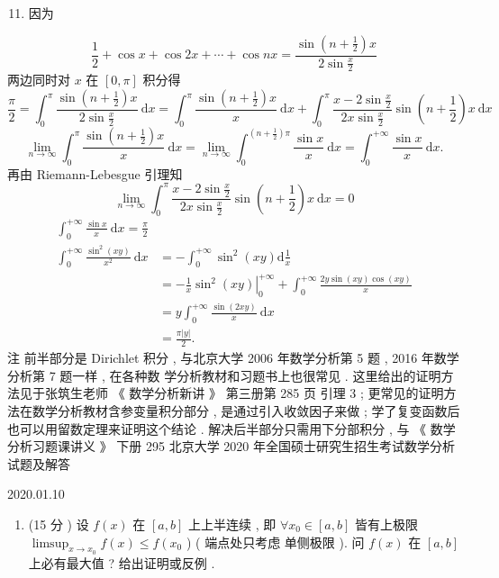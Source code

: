 \documentclass[10pt]{article}
\begin{document}
{\begin{enumerate}
  \setcounter{enumi}{10}
  \item  因为 
\end{enumerate}
$$
\frac{1}{2}+\cos x+\cos 2 x+\cdots+\cos n x=\frac{\sin \left(n+\frac{1}{2}\right) x}{2 \sin \frac{x}{2}}
$$
 两边同时对  $x$  在  $[0, \pi]$  积分得 
$$
\frac{\pi}{2}=\int_{0}^{\pi} \frac{\sin \left(n+\frac{1}{2}\right) x}{2 \sin \frac{x}{2}} \mathrm{~d} x=\int_{0}^{\pi} \frac{\sin \left(n+\frac{1}{2}\right) x}{x} \mathrm{~d} x+\int_{0}^{\pi} \frac{x-2 \sin \frac{x}{2}}{2 x \sin \frac{x}{2}} \sin \left(n+\frac{1}{2}\right) x \mathrm{~d} x
$$
$$
\lim _{n \rightarrow \infty} \int_{0}^{\pi} \frac{\sin \left(n+\frac{1}{2}\right) x}{x} \mathrm{~d} x=\lim _{n \rightarrow \infty} \int_{0}^{\left(n+\frac{1}{2}\right) \pi} \frac{\sin x}{x} \mathrm{~d} x=\int_{0}^{+\infty} \frac{\sin x}{x} \mathrm{~d} x .
$$
 再由  Riemann-Lebesgue  引理知 
$$
\lim _{n \rightarrow \infty} \int_{0}^{\pi} \frac{x-2 \sin \frac{x}{2}}{2 x \sin \frac{x}{2}} \sin \left(n+\frac{1}{2}\right) x \mathrm{~d} x=0
$$
$$
\begin{aligned}
\int_{0}^{+\infty} \frac{\sin x}{x} \mathrm{~d} x=\frac{\pi}{2} \\
\int_{0}^{+\infty} \frac{\sin ^{2}(x y)}{x^{2}} \mathrm{~d} x &=-\int_{0}^{+\infty} \sin ^{2}(x y) \mathrm{d} \frac{1}{x} \\
&=-\left.\frac{1}{x} \sin ^{2}(x y)\right|_{0} ^{+\infty}+\int_{0}^{+\infty} \frac{2 y \sin (x y) \cos (x y)}{x} \\
&=y \int_{0}^{+\infty} \frac{\sin (2 x y)}{x} \mathrm{~d} x \\
&=\frac{\pi|y|}{2} .
\end{aligned}
$$
 注   前半部分是  Dirichlet  积分 ,  与北京大学  2006  年数学分析第  5  题 , 2016  年数学分析第  7  题一样 ,  在各种数   学分析教材和习题书上也很常见 .  这里给出的证明方法见于张筑生老师  《 数学分析新讲 》 第三册第  285  页   引理  3 ;  更常见的证明方法在数学分析教材含参变量积分部分 ,  是通过引入收敛因子来做 ;  学了复变函数后   也可以用留数定理来证明这个结论 .  解决后半部分只需用下分部积分 ,  与 《 数学分析习题课讲义 》 下册  295  北京大学  2020  年全国硕士研究生招生考试数学分析试题及解答 

   

2020.01.10

\begin{enumerate}
  \item (15  分 )  设  $f(x)$  在  $[a, b]$  上上半连续 ,  即  $\forall x_{0} \in[a, b]$  皆有上极限  $\limsup _{x \rightarrow x_{0}} f(x) \leqslant f\left(x_{0}\right.$ ) ( 端点处只考虑   单侧极限 ).  问  $f(x)$  在  $[a, b]$  上必有最大值 ?  给出证明或反例 .


\end{enumerate}}
\end{document}
